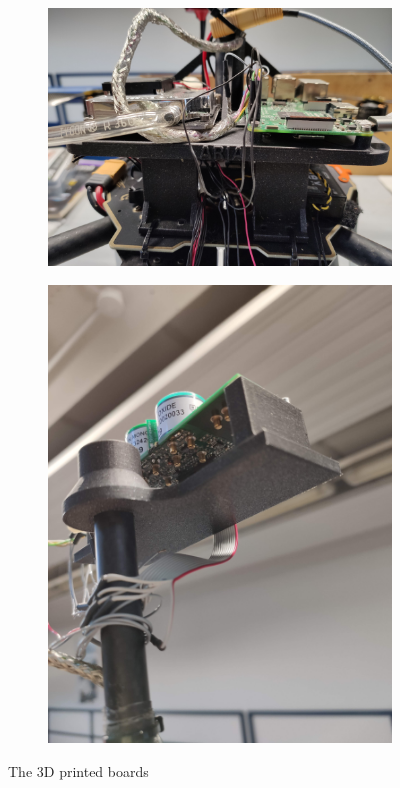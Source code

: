 \begin{figure}[h!]
    \centering
    \begin{subfigure}[b]{0.45\textwidth}
        \centering
        \includegraphics[width=\textwidth]{images/drone/IMG_20211105_103941.jpg}
        \caption{}
        \label{fig:pla1}
    \end{subfigure}
    \hfill
    \begin{subfigure}[b]{0.45\textwidth}
        \centering
        \includegraphics[width=\textwidth, angle=-90]{images/drone/IMG_20211105_115556.jpg}
        \caption{}
        \label{fig:pla2}
    \end{subfigure}
       \caption{The 3D printed boards}
       \label{fig:pla}
\end{figure}
\clearpage

